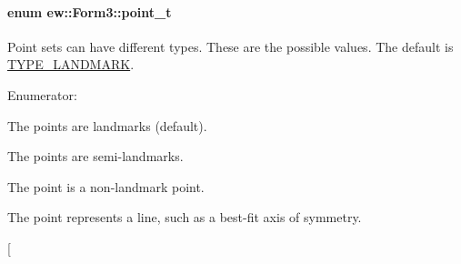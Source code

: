 \hypertarget{classew_1_1Form3_abfa10aaae60c2888a7e201cd8fd45733}{
\paragraph[{point\_\-t}]{\setlength{\rightskip}{0pt plus 5cm}enum {\bf ew::Form3::point\_\-t}}\hfill}
\label{classew_1_1Form3_abfa10aaae60c2888a7e201cd8fd45733}
Point sets can have different types. These are the possible values. The default is \hyperlink{classew_1_1Form3_abfa10aaae60c2888a7e201cd8fd45733aafd3312606d8242fd8a650020fb682c5}{TYPE\_\-LANDMARK}. \begin{Desc}
\item[Enumerator: ]\par
\begin{description}
\item[{\em 
\hypertarget{classew_1_1Form3_abfa10aaae60c2888a7e201cd8fd45733aafd3312606d8242fd8a650020fb682c5}{
TYPE\_\-LANDMARK}
\label{classew_1_1Form3_abfa10aaae60c2888a7e201cd8fd45733aafd3312606d8242fd8a650020fb682c5}
}]The points are landmarks (default). \item[{\em 
\hypertarget{classew_1_1Form3_abfa10aaae60c2888a7e201cd8fd45733a2ebb795c7e887f4d69bae678ad490df6}{
TYPE\_\-SEMI\_\-LANDMARK}
\label{classew_1_1Form3_abfa10aaae60c2888a7e201cd8fd45733a2ebb795c7e887f4d69bae678ad490df6}
}]The points are semi-\/landmarks. \item[{\em 
\hypertarget{classew_1_1Form3_abfa10aaae60c2888a7e201cd8fd45733a63adf7483ccd80afe7d295aecf1508c0}{
TYPE\_\-POINT}
\label{classew_1_1Form3_abfa10aaae60c2888a7e201cd8fd45733a63adf7483ccd80afe7d295aecf1508c0}
}]The point is a non-\/landmark point. \item[{\em 
\hypertarget{classew_1_1Form3_abfa10aaae60c2888a7e201cd8fd45733af4a3d6f8994ebe1d4ee511fdf4ba6da0}{
TYPE\_\-LINE}
\label{classew_1_1Form3_abfa10aaae60c2888a7e201cd8fd45733af4a3d6f8994ebe1d4ee511fdf4ba6da0}
}]The point represents a line, such as a best-\/fit axis of symmetry. \item[{\em 
}
\end{description}
\end{Desc}
